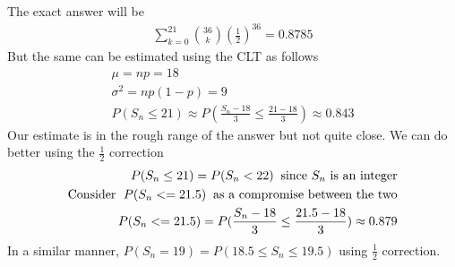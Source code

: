 \documentclass[../../probability-notes.tex]{subfiles}
\begin{document}
        The exact answer will be
        \begin{align*}
            \sum_{k=0}^{21}\binom{36}{k}(\frac{1}{2})^{36} = 0.8785
        \end{align*}
        But the same can be estimated using the CLT as follows
        \begin{align*}
            \mu = np = 18\\
            \sigma^{2} = np(1-p) = 9\\
            P(S_{n} \leq 21) \approx P(\frac{S_{n} - 18}{3} \leq \frac{21-18}{3}) \approx 0.843
        \end{align*}
        Our estimate is in the rough range of the answer but not quite close. We can do better using the $\frac{1}{2}$ correction
        \begin{align*}
            P(S_{n} \leq 21) = P(S_{n} < 22) \text{\;\;since $S_{n}$ is an integer}\\
            \text{Consider \;}P(S_{n} <= 21.5) \text{\;\;as a compromise between the two}\\
            P(S_{n} <= 21.5) = P(\frac{S_{n} - 18}{3} \leq \frac{21.5 - 18}{3}) \approx 0.879
        \end{align*}
        In a similar manner, $P(S_{n}=19) = P(18.5 \leq S_{n} \leq 19.5)$ using $\frac{1}{2}$ correction.
\end{document}
